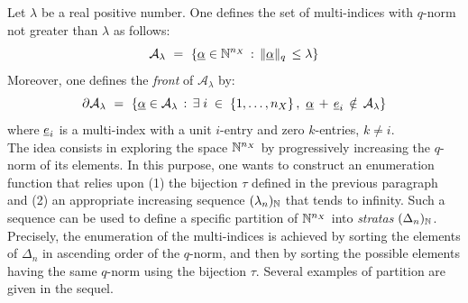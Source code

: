 {Let $\lambda$ be a real positive number. One defines the set of multi-indices with $q$-norm not greater than $\lambda$ as follows:
\begin{equation} \label{eq_q_set}
  \mathcal{A}_{\lambda} \, \, = \, \, \{\underline{\alpha} \in \mathbb{N}^{n_X} \, : \, \|\underline{\alpha}\|_q \, \leq \lambda \}
\end{equation}
Moreover, one defines the \emph{front} of $\mathcal{A}_{\lambda}$ by:
\begin{equation}
  \partial \mathcal{A}_{\lambda} \, \, = \, \, \left\{\underline{\alpha} \in \mathcal{A}_{\lambda} \, : \, \exists \; i \; \in \; \{1,\dots,n_X\} \, , \, \, \underline{\alpha} \, + \, \underline e_i \, \notin \, \mathcal{A}_{\lambda} \right\}
\end{equation}
where $\underline e_i$ is a multi-index with a unit $i$-entry and zero $k$-entries, $k\neq i$.  \\

The idea consists in exploring the space $\mathbb{N}^{n_X}$ by progressively increasing the $q$-norm of its elements. In this purpose, one wants to construct an enumeration function that relies upon (1) the bijection $\tau$ defined in the previous paragraph and (2) an appropriate increasing sequence $(\lambda_n)_{{\mathbb N}}$ that tends to infinity. Such a sequence can be used to define a specific partition of $\mathbb{N}^{n_X}$ into \textit{stratas} $(\Delta_n)_{{\mathbb N}}$. Precisely, the enumeration of the multi-indices is achieved by sorting the elements of $\Delta_n$ in ascending order of the $q$-norm, and then by sorting the possible elements having the same $q$-norm using the bijection $\tau$. Several examples of partition are given in the sequel. \\

}
